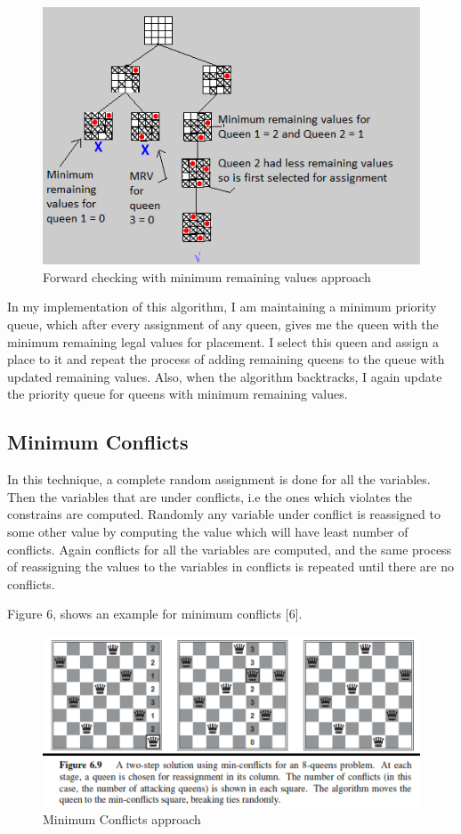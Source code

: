 \documentclass[conference]{IEEEtran}
\begin{document}
\begin{figure}
\includegraphics[scale=0.65]{ForwardCheckingWithMRV.png}
\caption{Forward checking with minimum remaining values approach}
\label{Figure5}
\end{figure}


In my implementation of this algorithm, I am maintaining a minimum priority queue, which after every  assignment of any queen, gives me the queen with the minimum remaining legal values for placement. I select this queen and assign a place to it and repeat the process of adding remaining queens to the queue with updated remaining values. Also, when the algorithm backtracks, I again update the priority queue for queens with minimum remaining values.

\subsection{Minimum Conflicts}

In this technique, a complete random assignment is done for all the variables. Then the variables that are under conflicts, i.e the ones which violates the constrains are computed. Randomly any variable under conflict is reassigned to some other value by computing the value which will have least number of conflicts. Again conflicts for all the variables are computed, and the same process of reassigning the values to the variables in conflicts is repeated until there are no conflicts.

Figure 6, shows an example for minimum conflicts [6]. 
\begin{figure}
\includegraphics[scale=0.65]{MinimumConflicts.png}
\caption{Minimum Conflicts approach}
\label{Figure6}
\end{figure}
\end{document}
